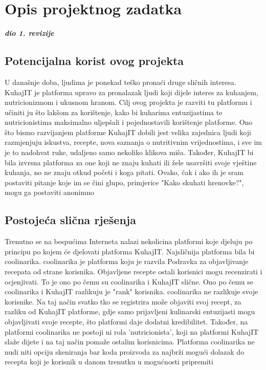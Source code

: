 \chapter{Opis projektnog zadatka}
		
		\textbf{\textit{dio 1. revizije}}\\
		
		\section{Potencijalna korist ovog projekta}

		U današnje doba, ljudima je ponekad teško pronaći druge sličnih interesa. KuhajIT je platforma upravo za pronalazak ljudi koji dijele interes za kuhanjem, nutricionizmom i ukusnom hranom. Cilj ovog projekta je razviti tu platformu i učiniti ju što lakšom za korištenje, kako bi kuharima entuzijastima te nutricionistima maksimalno uljepšali i pojednostavili korištenje platforme. Ono što bismo razvijanjem platforme KuhajIT dobili jest velika zajednica ljudi koji razmjenjuju iskustva, recepte, nova saznanja o nutritivnim vrijednostima, i sve im je to nadohvat ruke, udaljeno samo nekoliko klikova miša. Također, KuhajIT bi bila izvrsna platforma za one koji ne znaju kuhati ili žele usavršiti svoje vještine kuhanja, no ne znaju otkud početi i koga pitati. Ovako, čak i ako ih je sram postaviti pitanje koje im se čini glupo, primjerice "Kako skuhati hrenovke?", mogu ga postaviti anonimno
		
		\section{Postojeća slična rješenja}
		
		Trenutno se na bespućima Interneta nalazi nekolicina platformi koje djeluju po principu po kojem će djelovati platforma KuhajIT. Najsličnija platforma bila bi coolinarika. coolinarika je platforma koju je razvila Podravka za objavljivanje recepata od strane korisnika. Objavljene recepte ostali korisnici mogu recenzirati i ocjenjivati. To je ono po čemu su coolinarika i KuhajIT slične. Ono po čemu se coolinarika i KuhajIT razlikuju je "rank" korisnika. coolinarika ne razlikuje svoje korisnike. Na taj način svatko tko se registrira može objaviti svoj recept, za razliku od KuhajIT platforme, gdje samo prijavljeni kulinarski entuzijasti mogu objavljivati svoje recepte, što platformi daje dodatni kredibilitet. Također, na platformi coolinarika ne postoji ni rola 'nutricionista', koji na platformi KuhajIT slaže dijete i na taj način pomaže ostalim korisnicima. Platforma coolinarika ne nudi niti opciju skeniranja bar koda proizvoda za najbrži mogući dolazak do recepta koji je korisnik u danom trenutku u mogućnosti pripremiti
		
